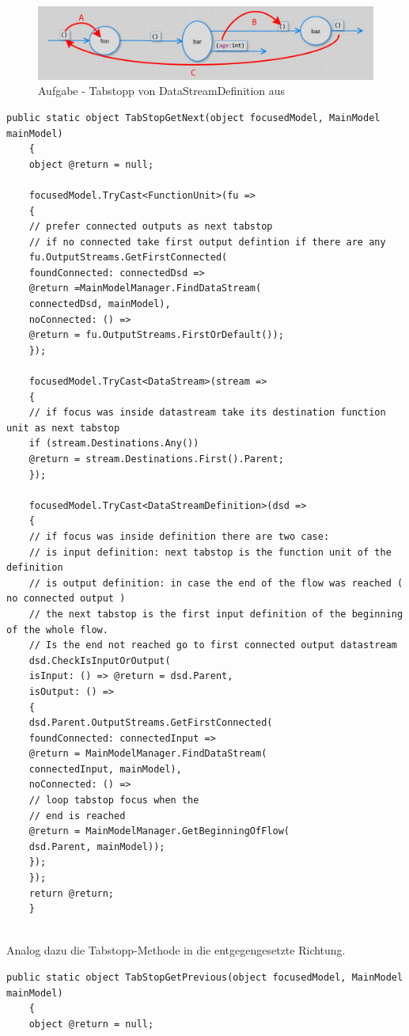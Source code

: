\begin{enumerate}
	
	\begin{figure}[H]
		\centering
		\includegraphics[width=\linewidth]{./img/tabstop_datastreamdefiniton.png}
		\caption{Aufgabe - Tabstopp von DataStreamDefinition aus}
	\end{figure}
	
	\begin{lstlisting}[caption=Tabstopp vorwärts]
	public static object TabStopGetNext(object focusedModel, MainModel mainModel)
	{
	object @return = null;
	
	focusedModel.TryCast<FunctionUnit>(fu =>
	{
	// prefer connected outputs as next tabstop
	// if no connected take first output defintion if there are any
	fu.OutputStreams.GetFirstConnected(
	foundConnected: connectedDsd => 
	@return =MainModelManager.FindDataStream(
	connectedDsd, mainModel),
	noConnected: () => 
	@return = fu.OutputStreams.FirstOrDefault());
	});
	
	focusedModel.TryCast<DataStream>(stream =>
	{
	// if focus was inside datastream take its destination function unit as next tabstop
	if (stream.Destinations.Any())
	@return = stream.Destinations.First().Parent;
	});
	
	focusedModel.TryCast<DataStreamDefinition>(dsd =>
	{
	// if focus was inside definition there are two case:
	// is input definition: next tabstop is the function unit of the definition
	// is output definition: in case the end of the flow was reached ( no connected output ) 
	// the next tabstop is the first input definition of the beginning of the whole flow.
	// Is the end not reached go to first connected output datastream
	dsd.CheckIsInputOrOutput( 
	isInput: () => @return = dsd.Parent,
	isOutput: () =>
	{
	dsd.Parent.OutputStreams.GetFirstConnected(
	foundConnected: connectedInput => 
	@return = MainModelManager.FindDataStream(
	connectedInput, mainModel),
	noConnected: () =>
	// loop tabstop focus when the 
	// end is reached
	@return = MainModelManager.GetBeginningOfFlow(
	dsd.Parent, mainModel)); 
	});
	});
	return @return;
	}
	
	\end{lstlisting}
	Analog dazu die Tabstopp-Methode in die entgegengesetzte Richtung.
	
	
	\begin{lstlisting}[caption=Tabstop rückwärts]
	public static object TabStopGetPrevious(object focusedModel, MainModel mainModel)
	{
	object @return = null;
	

\end{lstlisting}
\end{enumerate}
